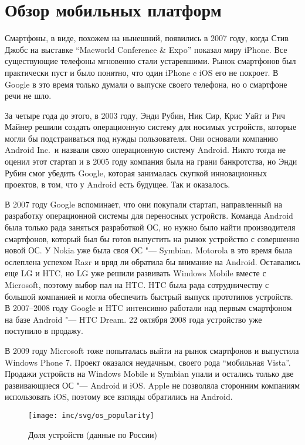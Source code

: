 \section{Обзор мобильных платформ}
\label{sec:platforms}
Смартфоны, в виде, похожем на нынешний, появились в 2007 году, когда Стив Джобс на выставке ``Macworld Conference \& Expo'' показал миру iPhone.
Все существующие телефоны мгновенно стали устаревшими.
Рынок смартфонов был практически пуст и было понятно, что один iPhone c iOS его не покроет.
В Google в это время только думали о выпуске своего телефона, но о смартфоне речи не шло.

За четыре года до этого, в 2003 году, Энди Рубин, Ник Сир, Крис Уайт и Рич Майнер решили создать операционную систему для носимых устройств, которые могли бы подстраиваться под нужды пользователя.
Они основали компанию Android Inc.\ и назвали свою операционную систему Android.
Никто тогда не оценил этот стартап и в 2005 году компания была на грани банкротства, но Энди Рубин смог убедить Google, которая занималась скупкой инновационных проектов, в том, что у Android есть будущее.
Так и оказалось.

В 2007 году Google вспоминает, что они покупали стартап, направленный на разработку операционной системы для переносных устройств.
Команда Android была только рада заняться разработкой ОС, но нужно было найти производителя смартфонов, который был бы готов выпустить на рынок устройство с совершенно новой ОС.
У Nokia уже была своя ОС "--- Symbian.
Motorola в это время была ослеплена успехом Razr и вряд ли обратила бы внимание на Android.
Оставались еще LG и HTC, но LG уже решили развивать Windows Mobile вместе с Microsoft, поэтому выбор пал на HTC\@.
HTC была рада сотрудничеству с большой компанией и могла обеспечить быстрый выпуск прототипов устройств.
В 2007--2008 году Google и HTC интенсивно работали над первым смартфоном на базе Android "--- HTC Dream.
22 октября 2008 года устройство уже поступило в продажу.


В 2009 году Microsoft тоже попыталась выйти на рынок смартфонов и выпустила Windows Phone 7.
Проект оказался неудачным, своего рода ``мобильная Vista''.
Продажи устройств на Windows Mobile и Symbian упали и остались только две развивающиеся ОС "--- Android и iOS\@.
Apple не позволяла сторонним компаниям использовать iOS, поэтому все взгляды обратились  на Android.

\begin{figure}[ht]
  \centering
  \texttt{[image: inc/svg/os\_popularity]}
  \caption{Доля устройств (данные по России)}
  \label{fig:osPopularity}
\end{figure}

